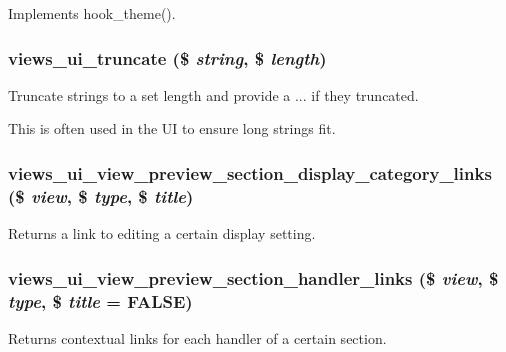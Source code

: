 Implements hook\_\-theme(). \hypertarget{views__ui_8module_a83deaf433f66036af4dd3363c52a936e}{
\subsubsection[{views\_\-ui\_\-truncate}]{\setlength{\rightskip}{0pt plus 5cm}views\_\-ui\_\-truncate (\$ {\em string}, \/  \$ {\em length})}}
\label{views__ui_8module_a83deaf433f66036af4dd3363c52a936e}
Truncate strings to a set length and provide a ... if they truncated.

This is often used in the UI to ensure long strings fit. \hypertarget{views__ui_8module_a768c0cc9ef12c3efe404e8192863e01f}{
\subsubsection[{views\_\-ui\_\-view\_\-preview\_\-section\_\-display\_\-category\_\-links}]{\setlength{\rightskip}{0pt plus 5cm}views\_\-ui\_\-view\_\-preview\_\-section\_\-display\_\-category\_\-links (\$ {\em view}, \/  \$ {\em type}, \/  \$ {\em title})}}
\label{views__ui_8module_a768c0cc9ef12c3efe404e8192863e01f}
Returns a link to editing a certain display setting. \hypertarget{views__ui_8module_a3ae40cf905b934b3054625fdcff0042d}{
\subsubsection[{views\_\-ui\_\-view\_\-preview\_\-section\_\-handler\_\-links}]{\setlength{\rightskip}{0pt plus 5cm}views\_\-ui\_\-view\_\-preview\_\-section\_\-handler\_\-links (\$ {\em view}, \/  \$ {\em type}, \/  \$ {\em title} = {\ttfamily FALSE})}}
\label{views__ui_8module_a3ae40cf905b934b3054625fdcff0042d}
Returns contextual links for each handler of a certain section.


